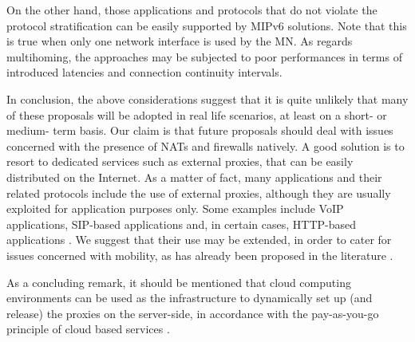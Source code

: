 \documentclass[preprint,12pt]{elsarticle}
\begin{document}
On the other hand, those applications and protocols that do not violate the 
protocol stratification can be easily supported by MIPv6 solutions. Note that 
this is true when only one network interface is used by the MN. As regards multihoming, the approaches may be subjected to poor performances in terms 
of introduced latencies and connection continuity intervals. 

In conclusion, the above considerations suggest that it is quite unlikely that many of these proposals will be adopted in real life scenarios, at least on a short- or medium- term basis. 
Our claim is that future proposals should deal with issues concerned with the presence of NATs and firewalls natively. 
A good solution is to resort to dedicated services such as external proxies, that can be easily distributed on the Internet. 
As a matter of fact, many applications and their related protocols include the use of external proxies, although they are usually exploited for application purposes only. 
Some examples include VoIP applications, SIP-based applications and, in certain cases, HTTP-based applications \cite{FerrettiG09}. 
We suggest that their use may be extended, in order to cater for issues concerned with mobility, as has already been proposed in the literature \cite{GhiniJSS,ghi06}.

As a concluding remark, it should be mentioned that cloud computing 
environments can be used as the infrastructure to dynamically set up (and release) 
the proxies on the server-side, in accordance with the pay-as-you-go 
principle of cloud based services \cite{cloud10}.
\end{document}
